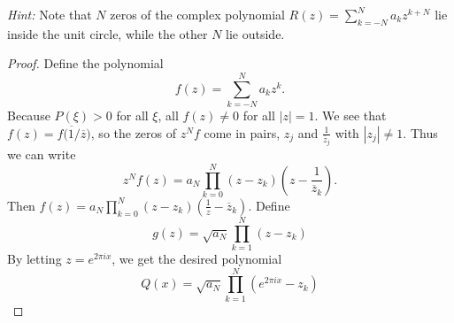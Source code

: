 \documentclass[a4paper]{article}
\begin{document}
\begin{enumerate}
{\it{Hint:}}  Note that $N$ zeros of the complex polynomial   $\displaystyle{ R(z) = \sum_{k=-N}^N a_k z^{k+N} }$ lie inside the unit circle, while the other $N$ lie outside.

\begin{proof}

  Define the polynomial
  \[ f(z) = \sum_{k=-N}^N a_k z^k .\]
  Because $P(\xi) > 0$ for all $\xi$, all $f(z) \neq 0$ for all $|z|=1$. We see that $f(z) = \overline{f(1/ \overline{z}})$, so the zeros of $z^N f$ come
  in pairs, $z_j$ and $\frac{1}{\overline{z}_j}$ with $|z_j| \neq 1$. Thus we can write
  \[ z^N f(z) = a_N \prod_{k=0}^N (z-z_k) \left( z - \frac{1}{\overline{z}_k} \right) .\]
  Then $f(z) = a_N \prod_{k=0}^N (z-z_k) \left( \frac{1}{z} - \overline{z}_k \right)$. Define
  \[ g(z) = \sqrt{a_N} \prod_{k=1}^N (z - z_k) \]
  By letting $z = e^{2 \pi i x}$, we get the desired polynomial
  \[ Q(x) = \sqrt{a_N} \prod_{k=1}^N (e^{2 \pi i x} - z_k) \]

\end{proof}

\end{enumerate}
\end{document}
